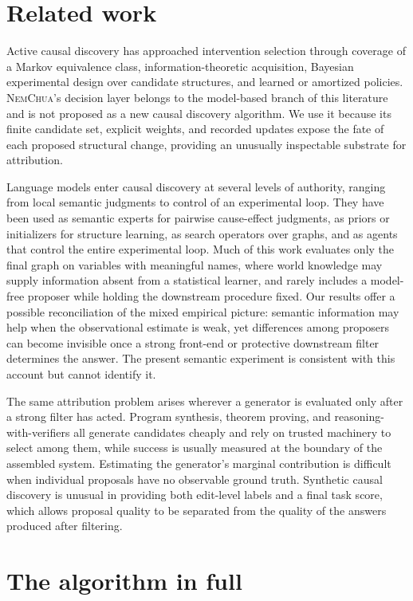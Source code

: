 \documentclass{article}
\newcommand{\nem}{\textsc{NemChua}}
\begin{document}
\section{Related work}
\label{sec:related}

Active causal discovery has approached intervention selection through coverage of a Markov
equivalence class, information-theoretic acquisition, Bayesian experimental design over candidate
structures, and learned or amortized policies. \nem's decision layer belongs to the model-based
branch of this literature and is not proposed as a new causal discovery algorithm. We use it because
its finite candidate set, explicit weights, and recorded updates expose the fate of each proposed
structural change, providing an unusually inspectable substrate for attribution.

Language models enter causal discovery at several levels of authority, ranging from local semantic
judgments to control of an experimental loop. They have been used as semantic experts for pairwise
cause-effect judgments, as priors or initializers for structure learning, as search operators over
graphs, and as agents that control the entire experimental loop. Much of this work evaluates only the
final graph on variables with meaningful names, where world knowledge may supply information absent
from a statistical learner, and rarely includes a model-free proposer while holding the downstream
procedure fixed. Our results offer a possible reconciliation of the mixed empirical picture:
semantic information may help when the observational estimate is weak, yet differences among
proposers can become invisible once a strong front-end or protective downstream filter determines the
answer. The present semantic experiment is consistent with this account but cannot identify it.

The same attribution problem arises wherever a generator is evaluated only after a strong filter has
acted. Program synthesis, theorem proving, and reasoning-with-verifiers all generate candidates
cheaply and rely on trusted machinery to select among them, while success is usually measured at the
boundary of the assembled system. Estimating the generator's marginal contribution is difficult when
individual proposals have no observable ground truth. Synthetic causal discovery is unusual in
providing both edit-level labels and a final task score, which allows proposal quality to be separated
from the quality of the answers produced after filtering.

\section{The algorithm in full}
\label{app:algorithm}
\end{document}

